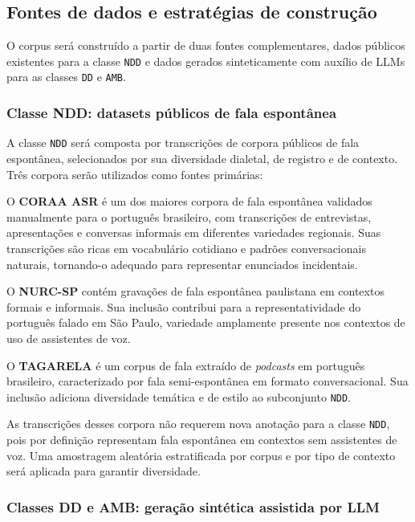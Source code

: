 \documentclass[
    12pt,                %
    openright,           %
    oneside,             %
    a4paper,             %
    english,             %
    brazil               %
]{abntex2}
\begin{document}
\subsection{Fontes de dados e estratégias de construção}
\label{sec:fontes_dados}

O corpus será construído a partir de duas fontes complementares, dados públicos existentes para a classe \texttt{NDD} e dados gerados sinteticamente com auxílio de LLMs para as classes \texttt{DD} e \texttt{AMB}.

\subsubsection{Classe NDD: datasets públicos de fala espontânea}

A classe \texttt{NDD} será composta por transcrições de corpora públicos de fala espontânea, selecionados por sua diversidade dialetal, de registro e de contexto. Três corpora serão utilizados como fontes primárias:

O \textbf{CORAA ASR} \cite{CORAA2023} é um dos maiores corpora de fala espontânea validados manualmente para o português brasileiro, com transcrições de entrevistas, apresentações e conversas informais em diferentes variedades regionais. Suas transcrições são ricas em vocabulário cotidiano e padrões conversacionais naturais, tornando-o adequado para representar enunciados incidentais.

O \textbf{NURC-SP} \cite{NURCSP2025} contém gravações de fala espontânea paulistana em contextos formais e informais. Sua inclusão contribui para a representatividade do português falado em São Paulo, variedade amplamente presente nos contextos de uso de assistentes de voz.

O \textbf{TAGARELA} \cite{Tagarela2026} é um corpus de fala extraído de \textit{podcasts} em português brasileiro, caracterizado por fala semi-espontânea em formato conversacional. Sua inclusão adiciona diversidade temática e de estilo ao subconjunto \texttt{NDD}.

As transcrições desses corpora não requerem nova anotação para a classe \texttt{NDD}, pois por definição representam fala espontânea em contextos sem assistentes de voz. Uma amostragem aleatória estratificada por corpus e por tipo de contexto será aplicada para garantir diversidade.

\subsubsection{Classes DD e AMB: geração sintética assistida por LLM}
\end{document}
